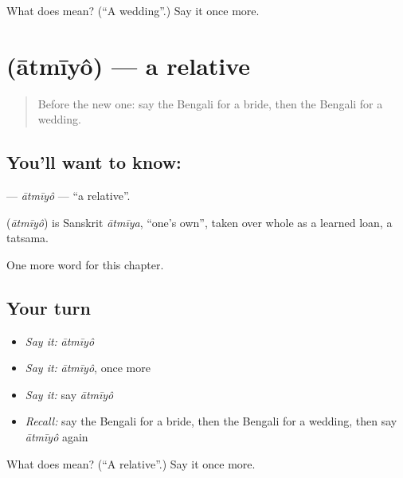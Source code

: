 \begin{tcolorbox}[breakable,colback=teal!4,colframe=teal!35!black,title={Before you move on}]
What does  mean? (\textquotedblleft{}A wedding\textquotedblright{}.) Say it once more.
\end{tcolorbox}
\section[\texorpdfstring{\bn{আত্মীয়} (ātmīyô)}{আত্মীয় (ātmīyô)}]{ (ātmīyô) — a relative}

\label{lesson:BN-C168-atmiyo}



\begin{quote}
Before the new one: say the Bengali for a bride, then the Bengali for a wedding.
\end{quote}

\subsection*{You'll want to know: }
\textbf{} — \emph{ātmīyô} — \textquotedblleft{}a relative\textquotedblright{}.

\begin{cousinweb}
\textbf{} (\emph{ātmīyô}) is Sanskrit \emph{ātmīya}, \textquotedblleft{}one's own\textquotedblright{}, taken over whole as a learned loan, a tatsama.
\end{cousinweb}

\begin{grammarlens}[title={What you've built}]
One more word for this chapter.
\end{grammarlens}

\subsection*{Your turn}
\begin{itemize}
\raggedright
  \item \emph{Say it:} \emph{ātmīyô}
  \item \emph{Say it:} \emph{ātmīyô}, once more
  \item \emph{Say it:} say \emph{ātmīyô}
  \item \emph{Recall:} say the Bengali for a bride, then the Bengali for a wedding, then say \emph{ātmīyô} again
\end{itemize}

\begin{tcolorbox}[breakable,colback=teal!4,colframe=teal!35!black,title={Before you move on}]
What does  mean? (\textquotedblleft{}A relative\textquotedblright{}.) Say it once more.
\end{tcolorbox}
